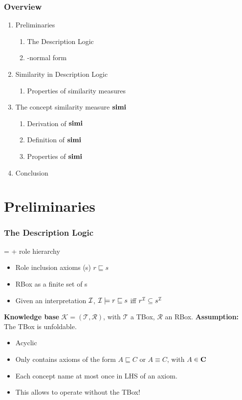 \documentclass[smaller]{beamer}
\begin{document}
\begin{frame}
  \frametitle{Overview}
  \begin{enumerate}
    \item Preliminaries
    \begin{enumerate}
      \item The \elh Description Logic
      \item \elh-normal form
    \end{enumerate}
    \item Similarity in Description Logic
    \begin{enumerate}
      \item Properties of similarity measures
    \end{enumerate}
    \item The concept similarity measure \(\operatorname{\mathbf{simi}}\)
    \begin{enumerate}
      \item Derivation of \(\operatorname{\mathbf{simi}}\)
      \item Definition of \(\operatorname{\mathbf{simi}}\)
      \item Properties of \(\operatorname{\mathbf{simi}}\)
    \end{enumerate}
    \item Conclusion
  \end{enumerate}
\end{frame}

\section{Preliminaries}

\begin{frame}
  \frametitle{The \elh{} Description Logic}
  \elh = \el + \alert{role hierarchy}
  \begin{itemize}[<+->]
    \item \alert{Role inclusion axioms} (\ria{}s) \(r \sqsubseteq s\)
    \item \alert{RBox} as a finite set of \ria{}s
    \item Given an interpretation \(\mathcal{I}\), \(\mathcal{I} \models r \sqsubseteq s\) iff \(r^{\mathcal{I}} \subseteq s^{\mathcal{I}}\)
  \end{itemize}
  \textbf{Knowledge base} \(\mathcal{K} = (\mathcal{T}, \mathcal{R})\), with \(\mathcal{T}\) a TBox, \(\mathcal{R}\) an RBox.
  \textbf{Assumption:} The TBox is \alert{unfoldable}.
  \begin{itemize}[<+->]
    \item Acyclic
    \item Only contains axioms of the form
    \(A \sqsubseteq C\) or \(A \equiv C\), with \(A \in \mathbf{C}\)
    \item Each concept name at most once in LHS of an axiom.
    \item This allows to operate without the TBox!
  \end{itemize}
\end{frame}
\end{document}
